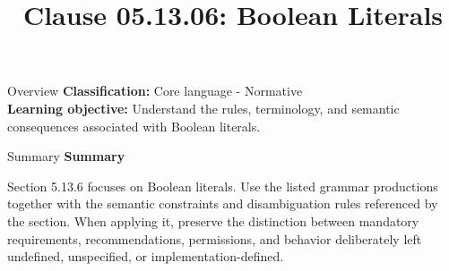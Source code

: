 \documentclass[10pt,letterpaper]{article}
\title{Clause 05.13.06: Boolean Literals}
\author{}
\date{}
\begin{document}
\maketitle
\begin{CornellOverviewBox}{Overview}
\textbf{Classification:} Core language - Normative\\[2pt]
\textbf{Learning objective:} Understand the rules, terminology, and semantic consequences associated with Boolean literals.
\end{CornellOverviewBox}\begin{CornellSummaryBox}{Summary}
{\sffamily\bfseries\color{Accent} Summary}\par\vspace{3pt}Section 5.13.6 focuses on Boolean literals. Use the listed grammar productions together with the semantic constraints and disambiguation rules referenced by the section. When applying it, preserve the distinction between mandatory requirements, recommendations, permissions, and behavior deliberately left undefined, unspecified, or implementation-defined.
\end{CornellSummaryBox}
\end{document}
